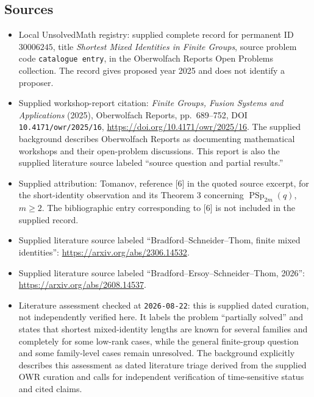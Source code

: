 \documentclass[11pt]{article}
\begin{document}
\subsection{Sources}
\begin{itemize}
\item Local UnsolvedMath registry: supplied complete record for permanent ID \(30006245\), title \emph{Shortest Mixed Identities in Finite Groups}, source problem code \texttt{catalogue entry}, in the Oberwolfach Reports Open Problems collection. The record gives proposed year 2025 and does not identify a proposer.
\item Supplied workshop-report citation: \emph{Finite Groups, Fusion Systems and Applications} (2025), Oberwolfach Reports, pp.\ 689--752, DOI \texttt{10.4171/owr/2025/16}, \url{https://doi.org/10.4171/owr/2025/16}. The supplied background describes Oberwolfach Reports as documenting mathematical workshops and their open-problem discussions. This report is also the supplied literature source labeled ``source question and partial results.''
\item Supplied attribution: Tomanov, reference [6] in the quoted source excerpt, for the short-identity observation and its Theorem 3 concerning \(\operatorname{PSp}_{2m}(q)\), \(m\geq 2\). The bibliographic entry corresponding to [6] is not included in the supplied record.
\item Supplied literature source labeled ``Bradford--Schneider--Thom, finite mixed identities'': \url{https://arxiv.org/abs/2306.14532}.
\item Supplied literature source labeled ``Bradford--Ersoy--Schneider--Thom, 2026'': \url{https://arxiv.org/abs/2608.14537}.
\item Literature assessment checked at \texttt{2026-08-22}: this is supplied dated curation, not independently verified here. It labels the problem ``partially solved'' and states that shortest mixed-identity lengths are known for several families and completely for some low-rank cases, while the general finite-group question and some family-level cases remain unresolved. The background explicitly describes this assessment as dated literature triage derived from the supplied OWR curation and calls for independent verification of time-sensitive status and cited claims.
\end{itemize}
\end{document}
